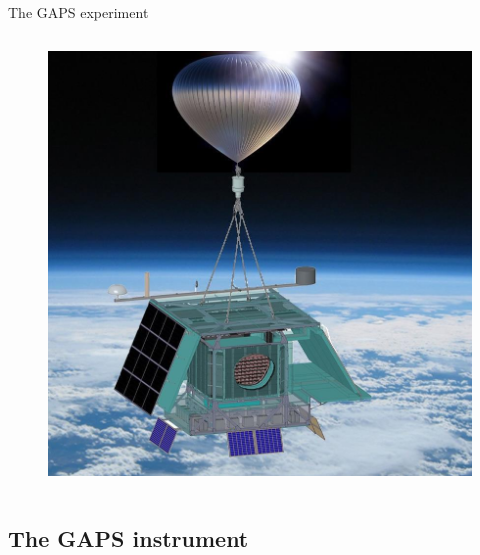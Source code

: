 \documentclass[aspectratio=169,xcolor=dvipsnames]{beamer}
\begin{document}
{\begin{frame}{The GAPS experiment}
\begin{columns}
        \begin{figure}
        \centering
        \includegraphics[height=0.64\textheight]{images/experiment_intro/gaps_ball.jpg}
        \end{figure}
    \end{columns}
\end{frame}
}

\subsection{The GAPS instrument}
\end{document}
